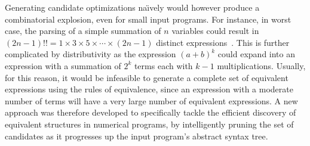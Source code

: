 Generating candidate optimizations na{\"\i}vely would however produce a
combinatorial explosion, even for small input programs.  For instance,
in worst case, the parsing of a simple summation of $n$ variables could
result in $(2n - 1)!! = 1\times3\times5\times\cdots\times(2n - 1)$ distinct
expressions~\cite{ioualalen, mouilleron}.  This is further complicated
by distributivity as the expression ${(a + b)}^k$ could expand into an
expression with a summation of $2^k$ terms each with $k - 1$ multiplications.
Usually, for this reason, it would be infeasible to generate a complete set
of equivalent expressions using the rules of equivalence, since an expression
with a moderate number of terms will have a very large number of equivalent
expressions.  A new approach was therefore developed to specifically tackle
the efficient discovery of equivalent structures in numerical programs, by
intelligently pruning the set of candidates as it progresses up the input
program's abstract syntax tree.
